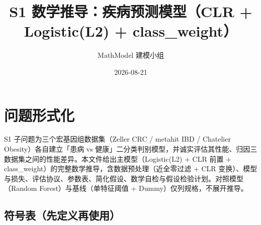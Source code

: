 \documentclass{internal-report}
\title{S1 数学推导：疾病预测模型（CLR + Logistic(L2) + class\_weight）}
\author{MathModel 建模小组}
\date{2026-08-21}
\begin{document}
\maketitle

\section{问题形式化}

S1 子问题为三个宏基因组数据集（Zeller CRC / metahit IBD / Chatelier Obesity）各自建立「患病 vs 健康」二分类判别模型，并诚实评估其性能、归因三数据集之间的性能差异。本文件给出主模型（Logistic(L2) + CLR 前置 + class\_weight）的完整数学推导，含数据预处理（近全零过滤 + CLR 变换）、模型与损失、评估协议、参数表、简化假设、数学自检与假设检验计划。对照模型（Random Forest）与基线（单特征阈值 + Dummy）仅列规格，不展开推导。

\subsection{符号表（先定义再使用）}
\end{document}
